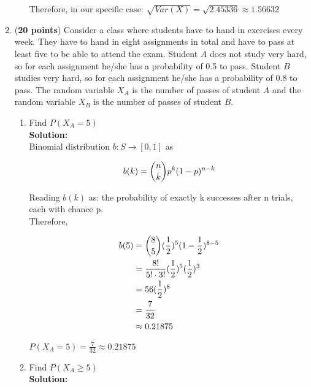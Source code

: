 \documentclass[a4paper]{article}
\begin{document}
\begin{enumerate}
\begin{enumerate}
Therefore, in our specific case: $\sqrt{Var(X)} = \sqrt{2.45336} \approx 1.56632$\\


	
	
\end{enumerate}



\item (\textbf{20 points}) Consider a class where students have to hand in exercises every week. They have to hand in eight assignments in total and have to pass at least five to be able to attend the exam. Student $A$ does not study very hard, so for each assignment he/she has a probability of 0.5 to pass. Student $B$ studies very hard, so for each assignment he/she has a probability of 0.8 to pass. The random variable $X_A$ is the number of passes of student $A$ and the random variable $X_B$ is the number of passes of student $B$.


\begin{enumerate}
	\item Find $P(X_A = 5)$\\
	\textbf{Solution:}\\
	
Binomial distribution $b : S \rightarrow [0,1]$ as

\begin{align}
	b(k) = {n \choose k}p^k(1-p)^{n-k}\notag
\end{align}
	
Reading $b(k)$ as: the probability of exactly k successes after n trials, each with chance p.\\


Therefore,

\begin{align}
	b(5) &= {8 \choose 5}(\frac{1}{2})^5(1 - \frac{1}{2})^{8 - 5}\notag\\
	&= \frac{8!}{5! \cdot 3!}(\frac{1}{2})^5(\frac{1}{2})^3\notag\\
	&= 56 (\frac{1}{2})^8\notag\\
	&= \frac{7}{32}\notag\\
	&\approx 0.21875\notag
\end{align}
	
$P(X_A = 5) = \frac{7}{32} \approx 0.21875$\\
	
	\item Find $P(X_A \geq 5)$\\
	\textbf{Solution:}\\
	

\end{enumerate}
\end{enumerate}
\end{document}
